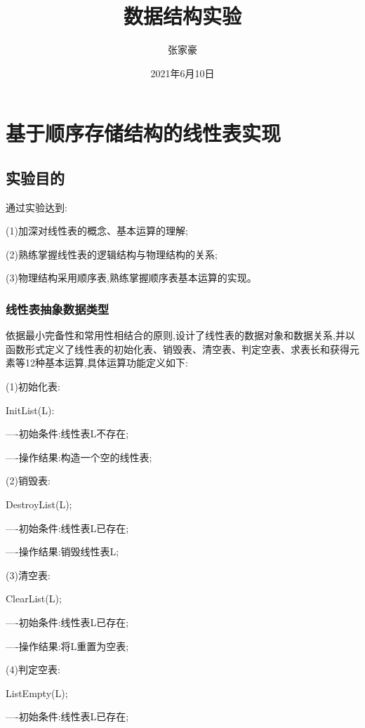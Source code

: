 \documentclass[supercite]{Experimental_Report}
\title{~~~~~~数据结构实验~~~~~~}
\author{张家豪}
\date{2021年6月10日}
\theoremstyle{definition}
\begin{document}
\maketitle

\clearpage


\tableofcontents[level=3]

\clearpage


\section{基于顺序存储结构的线性表实现}

\subsection{实验目的}

通过实验达到:

(1)加深对线性表的概念、基本运算的理解;

(2)熟练掌握线性表的逻辑结构与物理结构的关系;

(3)物理结构采用顺序表,熟练掌握顺序表基本运算的实现。

\subsubsection{线性表抽象数据类型}

依据最小完备性和常用性相结合的原则,设计了线性表的数据对象和数据关系,并以函数形式定义了线性表的初始化表、销毁表、清空表、判定空表、求表长和获得元素等12种基本运算,具体运算功能定义如下:

(1)初始化表:

InitList(L):

----初始条件:线性表L不存在;

----操作结果:构造一个空的线性表;

(2)销毁表:

DestroyList(L);

----初始条件:线性表L已存在;

----操作结果:销毁线性表L;

(3)清空表:

ClearList(L);

----初始条件:线性表L已存在;

----操作结果:将L重置为空表;

(4)判定空表:

ListEmpty(L);

----初始条件:线性表L已存在;
\end{document}
